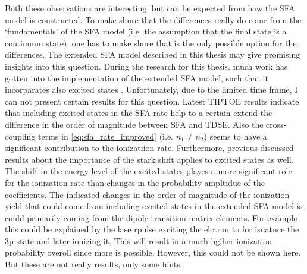 Both these observations are interesting, but can be expected from how the SFA model is constructed.
To make shure that the differences really do come from the `fundamentals' of the SFA model (i.e. the assumption that the final state is a continuum state), one has to make shure that is the only possible option for the differences.
The extended SFA model described in this thesis may give promising insights into this question.
During the research for this thesis, much work has gotten into the implementation of the extended SFA model, such that it incorparates also excited states .
Unfortunately, due to the limited time frame, I can not present certain results for this question. 
Latest TIPTOE results indicate that including excited states in the SFA rate help to a certain extend the difference in the order of magnitude between SFA and TDSE.
Also the cross-coupling terms in \eqref{eq:sfa_rate_improved} (i.e. $n_1 \neq n_2$) seems to have a significant contribution to the ionizatiion rate.
Furthermore, previous discussed results about the importance of the stark shift applies to excited states as well.
The shift in the energy level of the excited states playes a more significant role for the ionization rate than changes in the probability ampltidue of the coefficients.
The indicated changes in the order of magnitude of the ionization yield that could come from including excited states in the extended SFA model is could primarily coming from the dipole transition matrix elements.
For example this could be explained by the lase rpulse exciting the elctron to for isnatnce the 3p state and later ionizing it.
This will result in a much hgiher ionization probability overoll since more is possible.
However, this could not be shown here.
But these are not really results, only some hints.



















